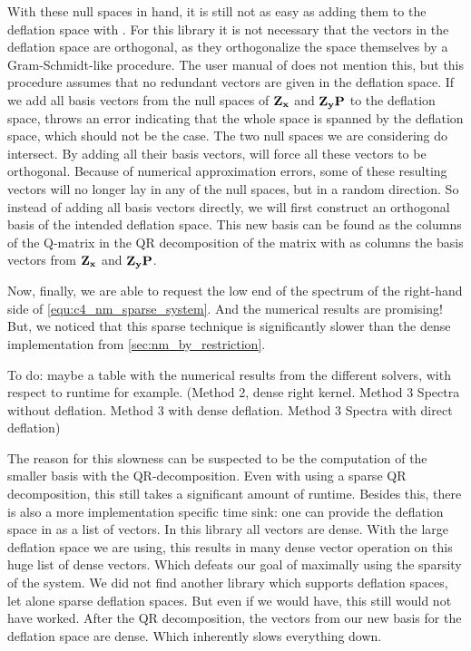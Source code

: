 With these null spaces in hand, it is still not as easy as adding them to the deflation space with \slepc. For this library it is not necessary that the vectors in the deflation space are orthogonal, as they orthogonalize the space themselves by a Gram-Schmidt-like procedure. The user manual of \slepc does not mention this, but this procedure assumes that no redundant vectors are given in the deflation space. If we add all basis vectors from the null spaces of $\vb{Z_x}$ and $\vb{Z_y}\vb{P}$ to the deflation space, \slepc throws an error indicating that the whole space is spanned by the deflation space, which should not be the case. The two null spaces we are considering do intersect. By adding all their basis vectors, \slepc will force all these vectors to be orthogonal. Because of numerical approximation errors, some of these resulting vectors will no longer lay in any of the null spaces, but in a random direction. So instead of adding all basis vectors directly, we will first construct an orthogonal basis of the intended deflation space. This new basis can be found as the columns of the Q-matrix in the QR decomposition of the matrix with as columns the basis vectors from $\vb{Z_x}$ and $\vb{Z_y} \vb{P}$.

Now, finally, we are able to request the low end of the spectrum of the right-hand side of \eqref{equ:c4_nm_sparse_system}. And the numerical results are promising! But, we noticed that this sparse technique is significantly slower than the dense implementation from \ref{sec:nm_by_restriction}.

{\color{red} To do: maybe a table with the numerical results from the different solvers, with respect to runtime for example. (Method 2, dense right kernel. Method 3 Spectra without deflation. Method 3 \slepc with dense deflation. Method 3 Spectra with direct deflation)}

The reason for this slowness can be suspected to be the computation of the smaller basis with the QR-decomposition. Even with using a sparse QR decomposition, this still takes a significant amount of runtime. Besides this, there is also a more implementation specific time sink: one can provide the deflation space in \slepc as a list of vectors. In this library all vectors are dense. With the large deflation space we are using, this results in many dense vector operation on this huge list of dense vectors. Which defeats our goal of maximally using the sparsity of the system. We did not find another library which supports deflation spaces, let alone sparse deflation spaces. But even if we would have, this still would not have worked. After the QR decomposition, the vectors from our new basis for the deflation space are dense. Which inherently slows everything down.

